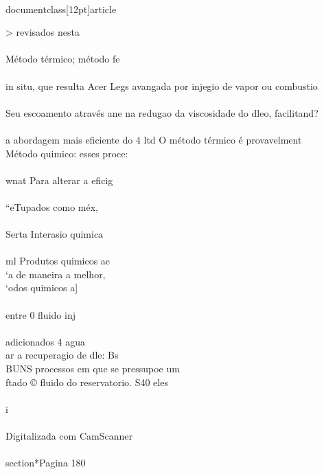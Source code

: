 \\documentclass[12pt]{article}
\begin{document}
{> revisados nesta\\
\\
Método térmico; método fe\\
\\
in situ, que resulta Acer Legs avangada por injegio de vapor ou combustio\\
\\
Seu escoamento através ane na redugao da viscosidade do dleo, facilitand?\\
\\
a abordagem mais eficiente do 4 ltd O método térmico é provavelment\\
Método quimico: esses proce:\\
\\
wnat Para alterar a eficig\\
\\
“eTupados como méx,\\
\\
Serta Interasio quimica\\
\\
ml Produtos quimicos ae\\
‘a de maneira a melhor,\\
‘odos quimicos a]\\
\\
entre 0 fluido inj\\
\\
adicionados 4 agua\\
ar a recuperagio de dle: Bs\\
BUNS processos em que se pressupoe um\\
ftado © fluido do reservatorio. S40 eles\\
\\
i\\
\\
Digitalizada com CamScanner\\

\\section*{Pagina 180}

}
\end{document}
